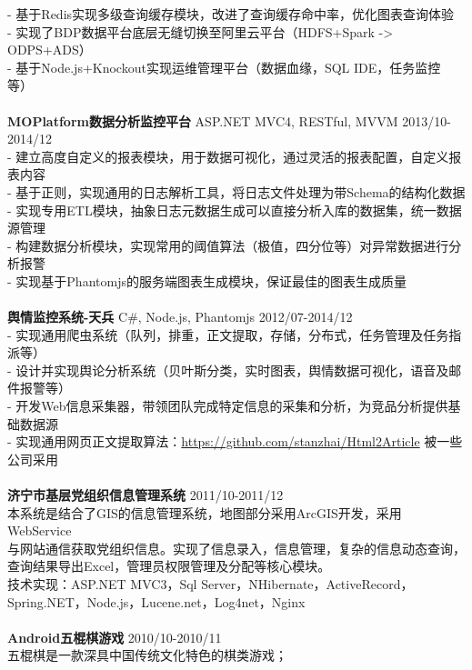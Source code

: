 \documentclass[UTF8,margin,line]{res}
\begin{document}
\begin{resume}
- 基于Redis实现多级查询缓存模块，改进了查询缓存命中率，优化图表查询体验 \\
- 实现了BDP数据平台底层无缝切换至阿里云平台（HDFS+Spark -> ODPS+ADS） \\
- 基于Node.js+Knockout实现运维管理平台（数据血缘，SQL IDE，任务监控等） \\
\\
\textbf{MOPlatform数据分析监控平台} ASP.NET MVC4, RESTful, MVVM 2013/10-2014/12 \\
- 建立高度自定义的报表模块，用于数据可视化，通过灵活的报表配置，自定义报表内容 \\
- 基于正则，实现通用的日志解析工具，将日志文件处理为带Schema的结构化数据 \\
- 实现专用ETL模块，抽象日志元数据生成可以直接分析入库的数据集，统一数据源管理 \\
- 构建数据分析模块，实现常用的阈值算法（极值，四分位等）对异常数据进行分析报警 \\
- 实现基于Phantomjs的服务端图表生成模块，保证最佳的图表生成质量 \\
\\
\textbf{舆情监控系统-天兵} C\#, Node.js, Phantomjs 2012/07-2014/12 \\
- 实现通用爬虫系统（队列，排重，正文提取，存储，分布式，任务管理及任务指派等） \\
- 设计并实现舆论分析系统（贝叶斯分类，实时图表，舆情数据可视化，语音及邮件报警等） \\
- 开发Web信息采集器，带领团队完成特定信息的采集和分析，为竞品分析提供基础数据源 \\
- 实现通用网页正文提取算法：\url{https://github.com/stanzhai/Html2Article} 被一些公司采用 \\
\\
\textbf{济宁市基层党组织信息管理系统}  2011/10-2011/12 \\
本系统是结合了GIS的信息管理系统，地图部分采用ArcGIS开发，采用WebService \\
与网站通信获取党组织信息。实现了信息录入，信息管理，复杂的信息动态查询， \\
查询结果导出Excel，管理员权限管理及分配等核心模块。\\
技术实现：ASP.NET MVC3，Sql Server，NHibernate，ActiveRecord， \\
Spring.NET，Node.js，Lucene.net，Log4net，Nginx \\
\\
\textbf{Android五棍棋游戏}  2010/10-2010/11 \\
五棍棋是一款深具中国传统文化特色的棋类游戏； \\

\end{resume}
\end{document}
